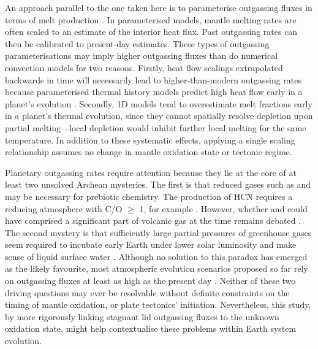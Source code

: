 An approach parallel to the one taken here is to parameterise outgassing fluxes in terms of melt production \citep[e.g.,][]{Sleep2001, Papuc2008, kite2009geodynamics, Kadoya2015, Foley2016, CHARNAY2017, KT2018, foley_carbon_2018, Krissansen-Totton2020}. In parameterised models, mantle melting rates are often scaled to an estimate of the interior heat flux. Past outgassing rates can then be calibrated to present-day estimates. These types of outgassing parameterisations may imply higher outgassing fluxes than do numerical convection models for two reasons. Firstly, heat flow scalings extrapolated backwards in time will necessarily lead to higher-than-modern outgassing rates because parameterised thermal history models predict high heat flow early in a planet's evolution \citep[e.g.,][]{TURCOTTE1980}. Secondly, 1D models tend to overestimate melt fractions early in a planet's thermal evolution, since they cannot spatially resolve depletion upon partial melting---local depletion would inhibit further local melting for the same temperature. In addition to these systematic effects, applying a single scaling relationship assumes no change in mantle oxidation state or tectonic regime.




Planetary outgassing rates require attention because they lie at the core of at least two unsolved Archean mysteries. The first is that reduced gases such as  and  may be necessary for prebiotic chemistry. The production of HCN requires a reducing atmosphere with C/O $\geq$ 1, for example \citep{Rimmer2019}. However, whether  and  could have comprised a significant part of volcanic gas at the time remains debated \citep[e.g.,][]{Zahnle2020}. The second mystery is that sufficiently large partial pressures of greenhouse gases seem required to incubate early Earth under lower solar luminosity \citep{charnay2020} and make sense of liquid surface water \citep{Sagan1972}. Although no solution to this paradox has emerged as the likely favourite, most atmospheric evolution scenarios proposed so far rely on  outgassing fluxes at least as high as the present day \citep[e.g.,][]{Sleep2001, Wordsworth2013, KANZAKI2018}. Neither of these two driving questions may ever be resolvable without definite constraints on the timing of mantle oxidation, or plate tectonics' initiation. Nevertheless, this study, by more rigorously linking stagnant lid outgassing fluxes to the unknown oxidation state, might help contextualise these problems within Earth system evolution.





